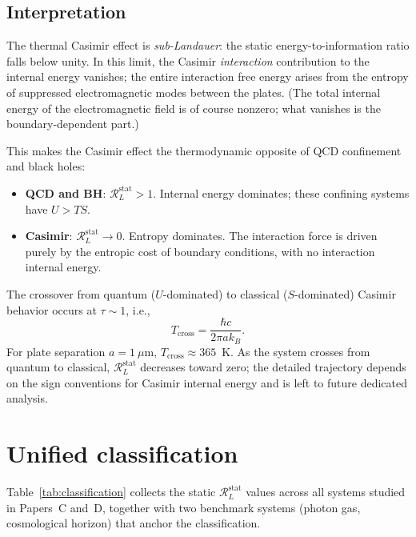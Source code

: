 \documentclass[%
 aip,
 amsmath,amssymb,
 reprint,%
]{revtex4-2}
\newcommand{\RLs}{\mathcal{R}_L^{\mathrm{stat}}}
\begin{document}
\subsection{Interpretation}

The thermal Casimir effect is \emph{sub-Landauer}: the static
energy-to-information ratio falls below unity.  In this limit, the
Casimir \emph{interaction} contribution to the internal energy
vanishes; the entire interaction free energy arises from the entropy
of suppressed electromagnetic modes between the plates.  (The total
internal energy of the electromagnetic field is of course nonzero;
what vanishes is the boundary-dependent part.)

This makes the Casimir effect the thermodynamic opposite of QCD
confinement and black holes:
\begin{itemize}
\item \textbf{QCD and BH}: $\RLs > 1$.  Internal
energy dominates; these confining systems have $U > TS$.
\item \textbf{Casimir}: $\RLs \to 0$.  Entropy dominates.
The interaction force is driven purely by the entropic cost of
boundary conditions, with no interaction internal energy.
\end{itemize}

The crossover from quantum ($U$-dominated) to classical
($S$-dominated) Casimir behavior occurs at $\tau \sim 1$, i.e.,
\begin{equation}
T_{\mathrm{cross}} = \frac{\hbar c}{2\pi a k_B}.
\end{equation}
For plate separation $a = 1~\mu\mathrm{m}$, $T_{\mathrm{cross}} \approx 365$~K.
As the system crosses from quantum to classical, $\RLs$
decreases toward zero; the detailed trajectory depends on the
sign conventions for Casimir internal energy and is left to
future dedicated analysis.


\section{Unified classification}
\label{sec:classification}

Table~\ref{tab:classification} collects the static $\RLs$
values across all systems studied in Papers~C and~D, together with
two benchmark systems (photon gas, cosmological horizon) that
anchor the classification.
\end{document}
